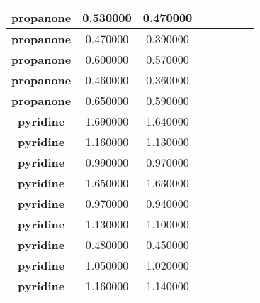 \documentclass{amsart}
\begin{document}
\begin{center}
\begin{tabular}{c|c|c|c|c|c|c|c}
\textbf{propanone}&0.530000&0.470000 \\ \hline 
\textbf{propanone}&0.470000&0.390000 \\ \hline 
\textbf{propanone}&0.600000&0.570000 \\ \hline 
\textbf{propanone}&0.460000&0.360000 \\ \hline 
\textbf{propanone}&0.650000&0.590000 \\ \hline 
\textbf{pyridine}&1.690000&1.640000 \\ \hline 
\textbf{pyridine}&1.160000&1.130000 \\ \hline 
\textbf{pyridine}&0.990000&0.970000 \\ \hline 
\textbf{pyridine}&1.650000&1.630000 \\ \hline 
\textbf{pyridine}&0.970000&0.940000 \\ \hline 
\textbf{pyridine}&1.130000&1.100000 \\ \hline 
\textbf{pyridine}&0.480000&0.450000 \\ \hline 
\textbf{pyridine}&1.050000&1.020000 \\ \hline 
\textbf{pyridine}&1.160000&1.140000 \\ \hline 
\end{tabular} 
\end{center} 
\end{document}
